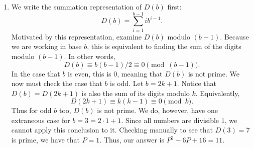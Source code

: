 \begin{enumerate}
    \item We write the summation representation of \( D \left( b \right) \)
        first:
        \[
            D \left( b \right) = \sum_{i = 1}^{b - 1} i b^{i - 1}
        .\]
        Motivated by this representation, examine \( D \left( b \right) \)
        modulo \( \left( b - 1 \right) \). Because we are working in base \( b
        \), this is equivalent to finding the sum of the digits modulo \(
        \left( b - 1 \right) \). In other words,
        \[
            D \left( b \right) \equiv b \left( b - 1 \right) / 2 \equiv 0 \pmod{\left( b - 1 \right)}
        .\]
        In the case that \( b \) is even, this is \( 0 \), meaning that \( D
        \left( b \right) \) is not prime. We now must check the case that \( b
        \) is odd. Let \( b = 2k + 1 \). Notice that \( D \left( b \right) = D
        \left( 2k + 1 \right) \) is also the sum of its digits modulo \( k \).
        Equivalently,
        \[
            D \left( 2k + 1 \right) \equiv k \left( k - 1 \right) \equiv 0 \pmod{k}
        .\]
        Thus for odd \( b \) too, \( D \left( b \right) \) is not prime. We do,
        however, have one extraneous case for \( b = 3 = 2 \cdot 1 + 1 \).
        Since all numbers are divisible \( 1 \), we cannot apply this
        conclusion to it. Checking manually to see that \( D \left( 3 \right) =
        7 \) is prime, we have that \( P = 1 \). Thus, our answer is \( P^2 -
        6P + 16 = \boxed{11}. \)

\end{enumerate}
